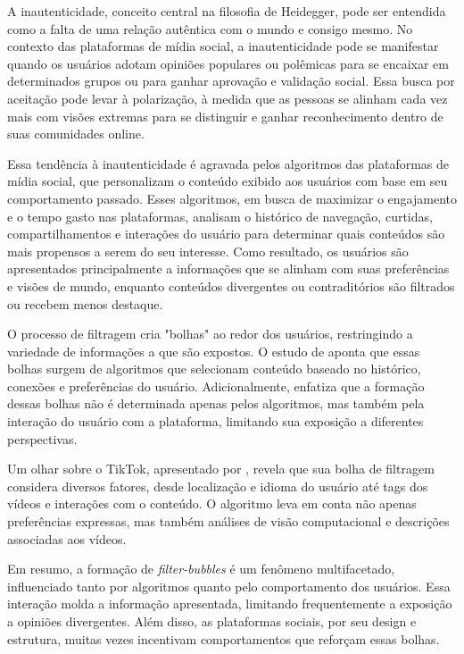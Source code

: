 A inautenticidade, conceito central na filosofia de Heidegger, pode ser entendida como a falta de uma relação autêntica com o mundo e consigo mesmo. No contexto das plataformas de mídia social, a inautenticidade pode se manifestar quando os usuários adotam opiniões populares ou polêmicas para se encaixar em determinados grupos ou para ganhar aprovação e validação social. Essa busca por aceitação pode levar à polarização, à medida que as pessoas se alinham cada vez mais com visões extremas para se distinguir e ganhar reconhecimento dentro de suas comunidades online.

Essa tendência à inautenticidade é agravada pelos algoritmos das plataformas de mídia social, que personalizam o conteúdo exibido aos usuários com base em seu comportamento passado. Esses algoritmos, em busca de maximizar o engajamento e o tempo gasto nas plataformas, analisam o histórico de navegação, curtidas, compartilhamentos e interações do usuário para determinar quais conteúdos são mais propensos a serem do seu interesse. Como resultado, os usuários são apresentados principalmente a informações que se alinham com suas preferências e visões de mundo, enquanto conteúdos divergentes ou contraditórios são filtrados ou recebem menos destaque.

O processo de filtragem cria "bolhas" ao redor dos usuários, restringindo a variedade de informações a que são expostos. O estudo de  aponta que essas bolhas surgem de algoritmos que selecionam conteúdo baseado no histórico, conexões e preferências do usuário. Adicionalmente,  enfatiza que a formação dessas bolhas não é determinada apenas pelos algoritmos, mas também pela interação do usuário com a plataforma, limitando sua exposição a diferentes perspectivas.

Um olhar sobre o TikTok, apresentado por , revela que sua bolha de filtragem considera diversos fatores, desde localização e idioma do usuário até tags dos vídeos e interações com o conteúdo. O algoritmo leva em conta não apenas preferências expressas, mas também análises de visão computacional e descrições associadas aos vídeos.

Em resumo, a formação de \textit{filter-bubbles} é um fenômeno multifacetado, influenciado tanto por algoritmos quanto pelo comportamento dos usuários. Essa interação molda a informação apresentada, limitando frequentemente a exposição a opiniões divergentes. Além disso, as plataformas sociais, por seu design e estrutura, muitas vezes incentivam comportamentos que reforçam essas bolhas. 

